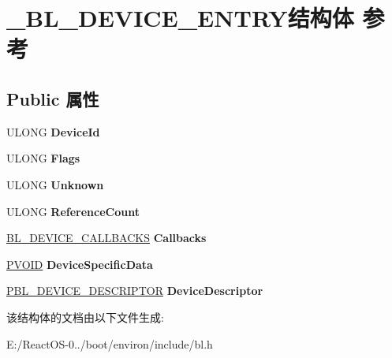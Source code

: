 \hypertarget{struct___b_l___d_e_v_i_c_e___e_n_t_r_y}{}\section{\+\_\+\+B\+L\+\_\+\+D\+E\+V\+I\+C\+E\+\_\+\+E\+N\+T\+R\+Y结构体 参考}
\label{struct___b_l___d_e_v_i_c_e___e_n_t_r_y}
\subsection*{Public 属性}
\begin{DoxyCompactItemize}
\item 
\mbox{\label{struct___b_l___d_e_v_i_c_e___e_n_t_r_y_a35d51bae34e595999c93ec7bcd5794fc}} 
U\+L\+O\+NG {\bfseries Device\+Id}
\item 
\mbox{\label{struct___b_l___d_e_v_i_c_e___e_n_t_r_y_a213fc21e201168539e87491b5249d9ef}} 
U\+L\+O\+NG {\bfseries Flags}
\item 
\mbox{\label{struct___b_l___d_e_v_i_c_e___e_n_t_r_y_a04f672f6ecfc3128076e377f1e0bc079}} 
U\+L\+O\+NG {\bfseries Unknown}
\item 
\mbox{\label{struct___b_l___d_e_v_i_c_e___e_n_t_r_y_aaceb788ec51c00765313620d2d290c59}} 
U\+L\+O\+NG {\bfseries Reference\+Count}
\item 
\mbox{\label{struct___b_l___d_e_v_i_c_e___e_n_t_r_y_a7c0a8fea7acd37efbc3d38d8bfa9c6e1}} 
\hyperlink{struct___b_l___d_e_v_i_c_e___c_a_l_l_b_a_c_k_s}{B\+L\+\_\+\+D\+E\+V\+I\+C\+E\+\_\+\+C\+A\+L\+L\+B\+A\+C\+KS} {\bfseries Callbacks}
\item 
\mbox{\label{struct___b_l___d_e_v_i_c_e___e_n_t_r_y_a838721add4865ba4a23be1dd7c98dfa3}} 
\hyperlink{interfacevoid}{P\+V\+O\+ID} {\bfseries Device\+Specific\+Data}
\item 
\mbox{\label{struct___b_l___d_e_v_i_c_e___e_n_t_r_y_a4560364ba93c200622fffd887d339933}} 
\hyperlink{struct___b_l___d_e_v_i_c_e___d_e_s_c_r_i_p_t_o_r}{P\+B\+L\+\_\+\+D\+E\+V\+I\+C\+E\+\_\+\+D\+E\+S\+C\+R\+I\+P\+T\+OR} {\bfseries Device\+Descriptor}
\end{DoxyCompactItemize}


该结构体的文档由以下文件生成\+:\begin{DoxyCompactItemize}
\item 
E\+:/\+React\+O\+S-\/0../boot/environ/include/bl.\+h\end{DoxyCompactItemize}
